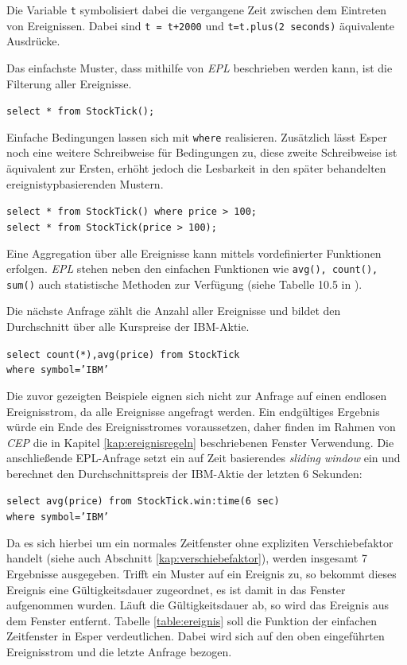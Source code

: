 \documentclass{acm_proc_article-sp}
\begin{document}
Die Variable \texttt{t} symbolisiert dabei die vergangene Zeit zwischen dem Eintreten von 
Ereignissen. Dabei sind \texttt{t = t+2000} und \texttt{t=t.plus(2 seconds)} äquivalente 
Ausdrücke. 

Das einfachste Muster, dass mithilfe von \textit{EPL} beschrieben werden kann, ist die 
Filterung aller Ereignisse.

\texttt{select * from StockTick();}

Einfache Bedingungen lassen sich mit \texttt{where} realisieren. Zusätzlich lässt Esper 
noch eine weitere Schreibweise für Bedingungen zu, diese zweite Schreibweise ist 
äquivalent zur Ersten, erhöht jedoch die Lesbarkeit in den später behandelten 
ereignistypbasierenden Mustern.

\texttt{select * from StockTick() where price > 100;}\\
\texttt{select * from StockTick(price > 100);}

Eine Aggregation über alle Ereignisse kann mittels vordefinierter Funktionen erfolgen. 
\textit{EPL} 
stehen neben den einfachen Funktionen wie \texttt{avg(), count(), sum()} auch 
statistische Methoden zur Verfügung (siehe Tabelle 10.5 in \cite{esper-reference}).

Die nächste Anfrage zählt die Anzahl aller Ereignisse und bildet den Durchschnitt über 
alle Kurspreise der IBM-Aktie.

\texttt{select  count(*),avg(price) from StockTick\\where symbol='IBM'}

Die zuvor gezeigten Beispiele eignen sich nicht zur Anfrage auf einen endlosen 
Ereignisstrom, da alle Ereignisse angefragt werden. Ein endgültiges Ergebnis würde ein 
Ende des Ereignisstromes voraussetzen, daher finden im Rahmen von \textit{CEP} die in 
Kapitel \ref{kap:ereignisregeln} beschriebenen Fenster Verwendung. Die anschließende 
EPL-Anfrage setzt ein auf Zeit basierendes \textit{sliding window} ein und berechnet den 
Durchschnittspreis der IBM-Aktie der letzten 6 Sekunden:

\texttt{select  avg(price) from StockTick.win:time(6 sec)\\where symbol='IBM'}

Da es sich hierbei um ein normales Zeitfenster ohne expliziten Verschiebefaktor handelt 
(siehe auch Abschnitt \ref{kap:verschiebefaktor}), werden insgesamt 7 Ergebnisse 
ausgegeben. Trifft ein Muster auf ein Ereignis zu, so bekommt dieses Ereignis eine 
Gültigkeitsdauer zugeordnet, es ist damit in das Fenster aufgenommen wurden. Läuft die 
Gültigkeitsdauer ab, so wird das Ereignis aus dem Fenster entfernt. Tabelle 
\ref{table:ereignis} soll die Funktion der einfachen Zeitfenster in Esper verdeutlichen. 
Dabei wird sich auf den oben eingeführten Ereignisstrom und die letzte Anfrage bezogen.
\end{document}
